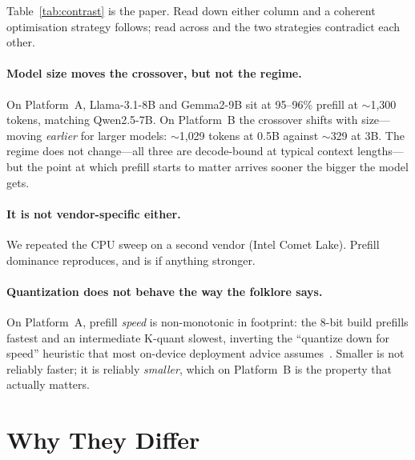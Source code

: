\documentclass[sigconf,nonacm,10pt]{acmart}
\begin{document}
Table~\ref{tab:contrast} is the paper. Read down either column and a coherent optimisation strategy follows;
read across and the two strategies contradict each other.

\paragraph{Model size moves the crossover, but not the regime.} On Platform~A, Llama-3.1-8B and Gemma2-9B sit at
95--96\% prefill at $\sim$1{,}300 tokens, matching Qwen2.5-7B. On Platform~B the crossover shifts with size---moving
\emph{earlier} for larger models: $\sim$1{,}029 tokens at 0.5B against $\sim$329 at 3B. The regime does not
change---all three are decode-bound at typical context lengths---but the point at which prefill starts to matter
arrives sooner the bigger the model gets.

\paragraph{It is not vendor-specific either.} We repeated the CPU sweep on a second vendor (Intel Comet Lake).
Prefill dominance reproduces, and is if anything stronger.

\paragraph{Quantization does not behave the way the folklore says.} On Platform~A, prefill \emph{speed} is
non-monotonic in footprint: the 8-bit build prefills fastest and an intermediate K-quant slowest, inverting the
``quantize down for speed'' heuristic that most on-device deployment advice
assumes~\cite{dettmers2022llmint8,frantar2023gptq,lin2024awq}. Smaller is not reliably faster; it is reliably
\emph{smaller}, which on Platform~B is the property that actually matters.


\section{Why They Differ}
\label{sec:why}
\end{document}
